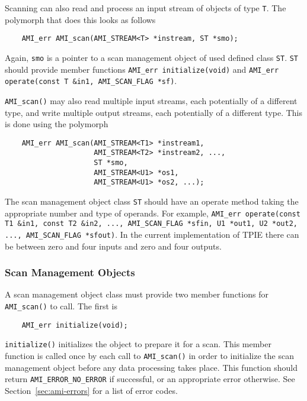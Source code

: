 Scanning can also read and process an input stream of objects of type
\verb|T|.  The polymorph that does this looks as follows
\begin{verbatim}
    AMI_err AMI_scan(AMI_STREAM<T> *instream, ST *smo);
\end{verbatim}
Again, \verb|smo| is a pointer to a scan management object of used
defined class \verb|ST|.  \verb|ST| should provide member functions
{\tt AMI\_err initialize(void)} and {\tt AMI\_err operate(const T
  \&in1, AMI\_SCAN\_FLAG *sf)}.

\verb|AMI_scan()| may also read multiple input streams, each
potentially of a different type, and write multiple output streams,
each potentially of a different type.  This is done using the polymorph
\begin{verbatim}
    AMI_err AMI_scan(AMI_STREAM<T1> *instream1, 
                     AMI_STREAM<T2> *instream2, ..., 
                     ST *smo, 
                     AMI_STREAM<U1> *os1, 
                     AMI_STREAM<U1> *os2, ...);
\end{verbatim}
The scan management object class \verb|ST| should have an operate
method taking the appropriate number and type of operands.  For
example, {\tt AMI\_err operate(const T1 \&in1, const T2 \&in2, ...,
  AMI\_SCAN\_FLAG *sfin, U1 *out1, U2 *out2, ..., AMI\_SCAN\_FLAG
  *sfout)}.  In the current implementation of TPIE there can be
between zero and four inputs and zero and four outputs.


\subsubsection{Scan Management Objects}  

A scan management object class must provide two member functions for
\verb|AMI_scan()| to call. The first is
\begin{verbatim}
    AMI_err initialize(void);
\end{verbatim}
\verb|initialize()| initializes the object to prepare it for a scan.  This
member function is called once by each call to \verb|AMI_scan()| in order
to initialize the scan management object before any data processing takes
place. This function should return \verb|AMI_ERROR_NO_ERROR| if
successful, or an appropriate error otherwise. See
Section~\ref{sec:ami-errors} for a list of error codes.

